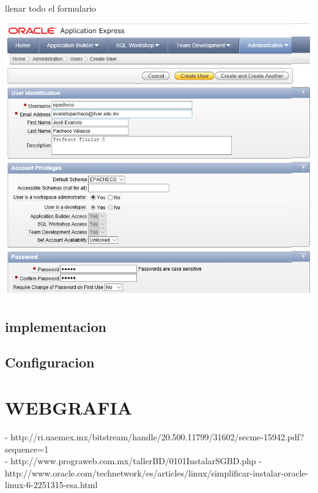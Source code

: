 \documentclass[12pt,letterpaper]{article}
\begin{document}
llenar todo el formulario
\begin{center}
\includegraphics[width=15cm]{./IMG/img34}
\end{center}

\subsection{implementacion}
\subsection{Configuracion}





\section{WEBGRAFIA } 
- http://ri.uaemex.mx/bitstream/handle/20.500.11799/31602/secme-15942.pdf?sequence=1\\
- http://www.prograweb.com.mx/tallerBD/0101InstalarSGBD.php
- http://www.oracle.com/technetwork/es/articles/linux/simplificar-instalar-oracle-linux-6-2251315-esa.html
\end{document}
